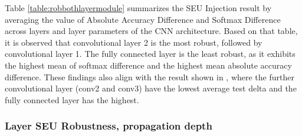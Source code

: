 Table \ref{table:robbothlayermodule} summarizes the SEU Injection result by averaging the value of Absolute Accuracy Difference and Softmax Difference across layers and layer parameters of the CNN architecture. Based on that table, it is observed that convolutional layer 2 is the most robust, followed by convolutional layer 1. The fully connected layer is the least robust, as it exhibits the highest mean of softmax difference and the highest mean absolute accuracy difference. These findings also align with the result shown in \cite{dennispoperobustcnn}, where the further convolutional layer (conv2 and conv3) have the lowest average test delta and the fully connected layer has the highest.

\subsubsection {Layer SEU Robustness, propagation depth}







